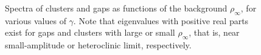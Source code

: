 \documentclass[10pt]{article}
\begin{document}
\begin{figure}[H]
\caption{Spectra of clusters and gaps as functions of the background $\rho_\infty$, for various values of $\gamma$. Note that eigenvalues with positive real parts exist for  gaps and clusters with large or small $\rho_\infty$, that is, near small-amplitude or heteroclinic limit, respectively.}
\label{bgst_eigs}
\end{figure}


% 
% 
% 
% 
\end{document}
